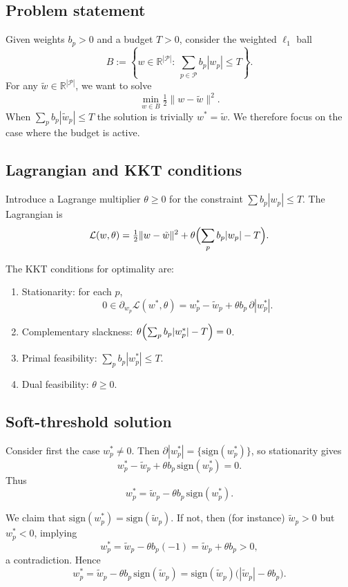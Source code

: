 \documentclass[11pt]{article}
\begin{document}
\subsection{Problem statement}

Given weights $b_p>0$ and a budget $T>0$, consider the weighted $\ell_1$ ball
\[
B := \left\{w\in\mathbb R^{|\mathcal P|}:\ \sum_{p\in\mathcal P} b_p |w_p| \le T\right\}.
\]
For any $\tilde w\in \mathbb R^{|\mathcal P|}$, we want to solve
\begin{equation}
  \min_{w\in B} \tfrac12\|w - \tilde w\|^2.
  \label{eq:l1-projection-problem}
\end{equation}
When $\sum_p b_p|\tilde w_p|\le T$ the solution is trivially $w^\ast=\tilde w$. We therefore focus on the case where the budget is active.

\subsection{Lagrangian and KKT conditions}

Introduce a Lagrange multiplier $\theta\ge 0$ for the constraint $\sum b_p|w_p|\le T$. The Lagrangian is
\[
\mathcal L(w,\theta) = \tfrac12\|w - \tilde w\|^2 + \theta\Bigl(\sum_{p} b_p |w_p| - T\Bigr).
\]

The KKT conditions for optimality are:
\begin{enumerate}[label=(\roman*)]
  \item Stationarity: for each $p$,
  \[
    0 \in \partial_{w_p} \mathcal L(w^\ast,\theta)
    = w_p^\ast - \tilde w_p + \theta b_p\,\partial |w_p^\ast|.
  \]
  \item Complementary slackness: $\theta \Bigl(\sum_p b_p |w_p^\ast| - T\Bigr)=0$.
  \item Primal feasibility: $\sum_p b_p |w_p^\ast|\le T$.
  \item Dual feasibility: $\theta\ge 0$.
\end{enumerate}

\subsection{Soft-threshold solution}

Consider first the case $w_p^\ast\neq 0$. Then $\partial |w_p^\ast| = \{\mathrm{sign}(w_p^\ast)\}$, so stationarity gives
\[
w_p^\ast - \tilde w_p + \theta b_p\,\mathrm{sign}(w_p^\ast)=0.
\]
Thus
\[
w_p^\ast
= \tilde w_p - \theta b_p\,\mathrm{sign}(w_p^\ast).
\]

We claim that $\mathrm{sign}(w_p^\ast) = \mathrm{sign}(\tilde w_p)$. If not, then (for instance) $\tilde w_p>0$ but $w_p^\ast<0$, implying
\[
w_p^\ast = \tilde w_p - \theta b_p (-1) = \tilde w_p + \theta b_p > 0,
\]
a contradiction. Hence
\[
w_p^\ast
= \tilde w_p - \theta b_p\,\mathrm{sign}(\tilde w_p)
= \mathrm{sign}(\tilde w_p)\bigl(|\tilde w_p| - \theta b_p\bigr).
\]
\end{document}
